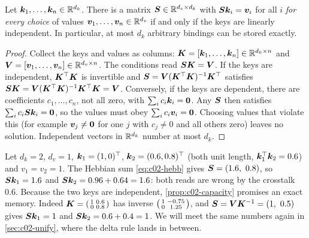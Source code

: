 \begin{proposition}\label{prop:c02-capacity}
Let $\bm{k}_1, \dots, \bm{k}_n \in \mathbb{R}^{d_k}$. There is a matrix $\bm{S} \in \mathbb{R}^{d_v\times d_k}$ with
$\bm{S}\bm{k}_i = \bm{v}_i$ for all $i$ \emph{for every choice} of values $\bm{v}_1,\dots,\bm{v}_n \in \mathbb{R}^{d_v}$
if and only if the keys are linearly independent. In particular, at most $d_k$ arbitrary
bindings can be stored exactly.
\end{proposition}

\begin{proof}
Collect the keys and values as columns: $\bm{K} = [\bm{k}_1, \dots, \bm{k}_n] \in \mathbb{R}^{d_k \times n}$ and
$\bm{V} = [\bm{v}_1,\dots,\bm{v}_n] \in \mathbb{R}^{d_v\times n}$. The conditions read $\bm{S}\bm{K} = \bm{V}$.
If the keys are independent, $\bm{K}^{\top}\bm{K}$ is invertible and $\bm{S} = \bm{V}(\bm{K}^{\top}\bm{K})^{-1}\bm{K}^{\top}$
satisfies $\bm{S}\bm{K} = \bm{V}(\bm{K}^{\top}\bm{K})^{-1}\bm{K}^{\top}\bm{K} = \bm{V}$. Conversely, if the keys are dependent,
there are coefficients $c_1, \dots, c_n$, not all zero, with $\sum_i c_i \bm{k}_i = \mathbf{0}$.
Any $\bm{S}$ then satisfies $\sum_i c_i \bm{S}\bm{k}_i = \mathbf{0}$, so the values must obey
$\sum_i c_i \bm{v}_i = \mathbf{0}$. Choosing values that violate this (for example
$\bm{v}_j \ne \mathbf{0}$ for one $j$ with $c_j \neq 0$ and all others zero) leaves no solution.
Independent vectors in $\mathbb{R}^{d_k}$ number at most $d_k$.
\end{proof}

\begin{example}\label{ex:c02-two-keys}
Let $d_k = 2$, $d_v = 1$, $\bm{k}_1 = (1, 0)^{\top}$, $\bm{k}_2 = (0.6, 0.8)^{\top}$ (both unit length,
$\bm{k}_1^{\top}\bm{k}_2 = 0.6$) and $v_1 = v_2 = 1$. The Hebbian sum \eqref{eq:c02-hebb} gives
$\bm{S} = (1.6,\ 0.8)$, so $\bm{S}\bm{k}_1 = 1.6$ and $\bm{S}\bm{k}_2 = 0.96 + 0.64 = 1.6$: both reads are wrong by
the crosstalk $0.6$. Because the two keys are independent, \cref{prop:c02-capacity} promises an
exact memory. Indeed $\bm{K} = \begin{psmallmatrix}1 & 0.6\\ 0 & 0.8\end{psmallmatrix}$ has inverse
$\begin{psmallmatrix}1 & -0.75\\ 0 & 1.25\end{psmallmatrix}$, and
$\bm{S} = \bm{V}\bm{K}^{-1} = (1,\ 0.5)$ gives $\bm{S}\bm{k}_1 = 1$ and $\bm{S}\bm{k}_2 = 0.6 + 0.4 = 1$. We will meet
the same numbers again in \cref{sec:c02-unify}, where the delta rule lands in between.
\end{example}

